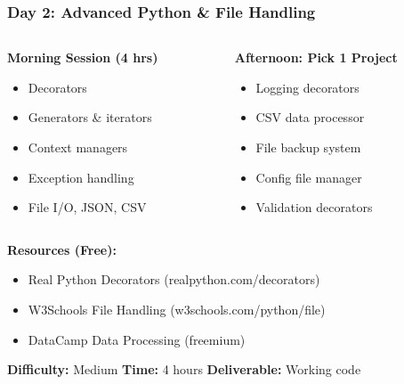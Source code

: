\begin{frame}[fragile]\frametitle{Day 2: Advanced Python \& File Handling}
\begin{columns}
    \begin{column}[T]{0.5\linewidth}
      \textbf{Morning Session (4 hrs)}
      \begin{itemize}
        \item Decorators
        \item Generators \& iterators
        \item Context managers
        \item Exception handling
        \item File I/O, JSON, CSV
      \end{itemize}
    \end{column}
    \begin{column}[T]{0.5\linewidth}
      \textbf{Afternoon: Pick 1 Project}
      \begin{itemize}
        \item Logging decorators
        \item CSV data processor
        \item File backup system
        \item Config file manager
        \item Validation decorators
      \end{itemize}
    \end{column}
  \end{columns}
  
  \vspace{0.3cm}
  \textbf{Resources (Free):}
  \begin{itemize}
    \item Real Python Decorators (realpython.com/decorators)
    \item W3Schools File Handling (w3schools.com/python/file)
    \item DataCamp Data Processing (freemium)
  \end{itemize}
  
\vspace{0.3cm}    
\textbf{Difficulty:} Medium \textbar \textbf{Time:} 4 hours \textbar \textbf{Deliverable:} Working code  
\end{frame}

